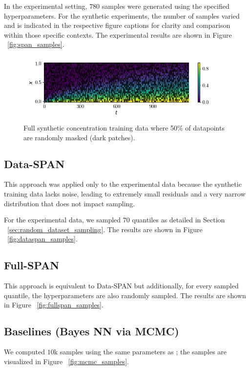In the experimental setting, $780$ samples were generated using the specified hyperparameters. For the synthetic experiments, the number of samples varied and is indicated in the respective figure captions for clarity and comparison within those specific contexts. The experimental results are shown in Figure ~\vref{fig:span_samples}.

\begin{figure}[h]
    \centering
    \includegraphics{figs/c_diss_field_train_random_subset.png}
    \caption{Full synthetic concentration training data where 50\% of datapoints are randomly masked (dark patches).}
    \label{fig:training_data_mask}
\end{figure}


\subsection{Data-SPAN}
This approach was applied only to the experimental data because the synthetic training data lacks noise, leading to extremely small residuals and a very narrow distribution that does not impact sampling.

For the experimental data, we sampled $70$ quantiles as detailed in Section ~\vref{sec:random_dataset_sampling}. The results are shown in Figure ~\vref{fig:dataspan_samples}.



\subsection{Full-SPAN}
This approach is equivalent to Data-SPAN but additionally, for every sampled quantile, the hyperparameters are also randomly sampled. The results are shown in Figure ~\vref{fig:fullspan_samples}.


\subsection{Baselines (Bayes NN via MCMC)}
We computed $10$k samples using the same parameters as \cite{finn}; the samples are visualized in Figure ~\vref{fig:mcmc_samples}.


